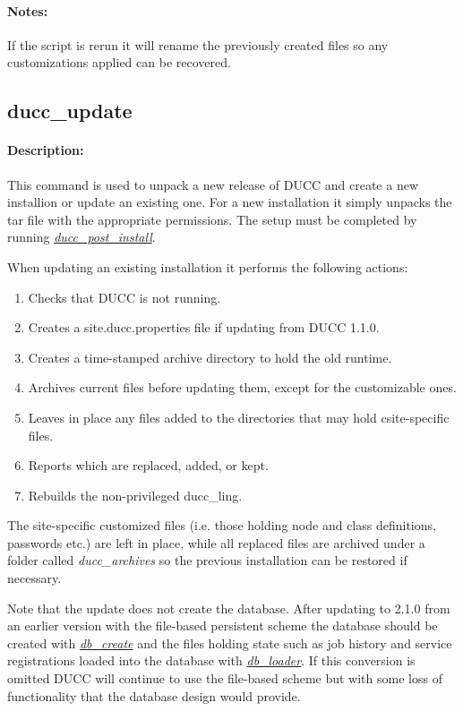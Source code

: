     \paragraph{Notes:}
    If the script is rerun it will rename the previously created files so any customizations applied
    can be recovered.

\subsection{ducc\_update}
\label{subsec:admin.ducc-update}

    \paragraph{Description:}
        This command is used to unpack a new release of DUCC and create a new installion or update
        an existing one.
        For a new installation it simply unpacks the tar file with the appropriate permissions.
        The setup must be completed by running \hyperref[subsec:admin.ducc-post-install]{\em ducc\_post\_install}.

        When updating an existing installation it performs the following actions:
        \begin{enumerate}
          \item Checks that DUCC is not running.
          \item Creates a site.ducc.properties file if updating from DUCC 1.1.0.
          \item Creates a time-stamped archive directory to hold the old runtime.
          \item Archives current files before updating them, except for the customizable ones.
          \item Leaves in place any files added to the directories that may hold csite-specific files.
          \item Reports which are replaced, added, or kept.
          \item Rebuilds the non-privileged ducc\_ling.
        \end{enumerate}

        The site-specific customized files (i.e. those holding node and class definitions,
        passwords etc.) are left in place, 
        while all replaced files are archived under a folder called {\em ducc\_archives} 
        so the previous installation can be restored if necessary.

        Note that the update does not create the database.  After updating to 2.1.0 from an earlier
        version with the file-based persistent scheme the database should be created with
        \hyperref[subsec:admin.db-create]{\em db\_create} 
        and the files holding state such as job history and service registrations loaded into the database with
        \hyperref[subsec:admin.db-loader]{\em db\_loader}.
        If this conversion is omitted DUCC will continue to use the file-based scheme but with some
        loss of functionality that the database design would provide.
        
